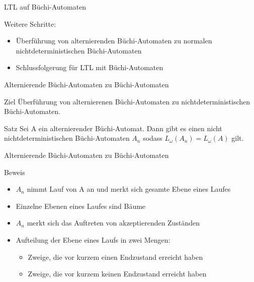 \begin{frame}{LTL auf Büchi-Automaten}
\begin{block}{Weitere Schritte:}
\vspace{1em}
\begin{itemize}
\setlength\itemsep{1em}
\item Überführung von alternierenden Büchi-Automaten zu normalen nichtdeterministischen Büchi-Automaten
\pause
\item Schlussfolgerung für LTL mit Büchi-Automaten
\end{itemize}
\end{block}
\end{frame}

\begin{frame}{Alternierende Büchi-Automaten zu Büchi-Automaten}
\begin{block}{Ziel}
Überführung von alternierenen Büchi-Automaten zu nichtdeterministischen Büchi-Automaten.
\end{block}
\vspace{1em}
\begin{block}{Satz \cite{vardi+96}}
Sei A ein alternierender Büchi-Automat. Dann gibt es einen nicht nichtdeterministischen Büchi-Automaten $A_n$ sodass $L_{\omega}(A_n)=L_{\omega}(A)$ gilt.
\end{block}
\end{frame}

\begin{frame}{Alternierende Büchi-Automaten zu Büchi-Automaten}
\begin{block}{Beweis \cite{vardi+96}}
\begin{itemize}
\setlength\itemsep{1em}
\item $A_n$ nimmt Lauf von A an und merkt sich gesamte Ebene eines Laufes
\item Einzelne Ebenen eines Laufes sind Bäume
\pause
\item $A_n$ merkt sich das Auftreten von akzeptierenden Zuständen
\pause
\item Aufteilung der Ebene eines Laufs in zwei Mengen:
\begin{itemize}
\item Zweige, die vor kurzem einen Endzustand erreicht haben
\item Zweige, die vor kurzem keinen Endzustand erreicht haben
\end{itemize}
\end{itemize}
\end{block}
\end{frame}

